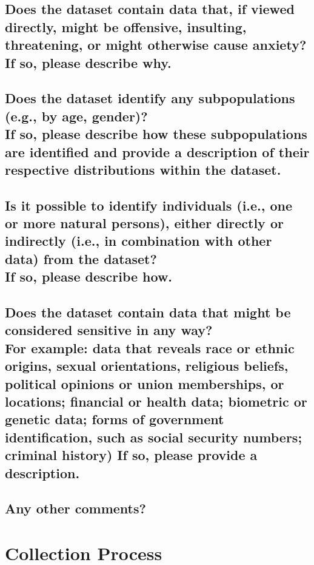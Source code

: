 \documentclass[letterpaper, 10 pt, conference]{ieeeconf}  %
\newcommand{\subtitle}[1]{{\\ \small \normalfont \color{purple} #1}}
\begin{document}
\lipsum[1]

\subsection{Does the dataset contain data that, if viewed directly, might be offensive, insulting, threatening, or might otherwise cause anxiety? \subtitle{If so, please describe why.}}

\lipsum[1]

\subsection{Does the dataset identify any subpopulations (e.g., by age, gender)? \subtitle{If so, please describe how these subpopulations are identified and provide a description of their respective distributions within the dataset.}}

\lipsum[1]

\subsection{Is it possible to identify individuals (i.e., one or more natural persons), either directly or indirectly (i.e., in combination with other data) from the dataset? \subtitle{If so, please describe how.}}

\lipsum[1]

\subsection{Does the dataset contain data that might be considered sensitive in any way? \subtitle{For example: data that reveals race or ethnic origins, sexual orientations, religious beliefs, political opinions or union memberships, or locations; financial or health data; biometric or genetic data; forms of government identification, such as social security numbers; criminal history) If so, please provide a description.}}

\lipsum[1]

\subsection{Any other comments?}

\lipsum[1]

\section{Collection Process}
\end{document}
